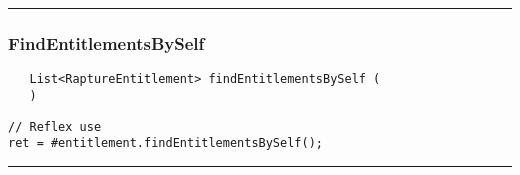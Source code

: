 \rule{15cm}{2pt}
\subsubsection{FindEntitlementsBySelf}
\label{Api:FindEntitlementsBySelf}
\begin{verbatim}
   List<RaptureEntitlement> findEntitlementsBySelf (
   )
\end{verbatim}
\begin{lstlisting}[language=reflex]
// Reflex use
ret = #entitlement.findEntitlementsBySelf();
\end{lstlisting}



\rule{15cm}{2pt}
